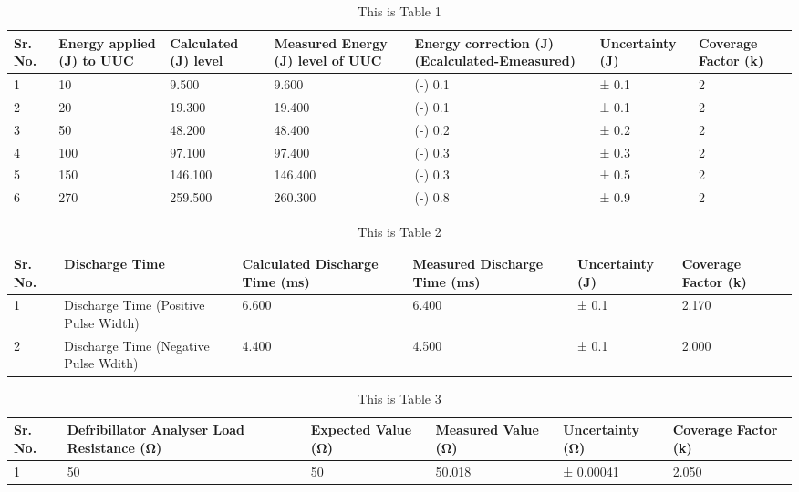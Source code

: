\begin{table}
\caption{This is Table 1}
\begin{tabular}{|p{2.2857142857142856 cm}|p{2.2857142857142856 cm}|p{2.2857142857142856 cm}|p{2.2857142857142856 cm}|p{2.2857142857142856 cm}|p{2.2857142857142856 cm}|p{2.2857142857142856 cm}|}
\toprule
Sr. No. & Energy applied (J) to UUC & Calculated (J) level & Measured Energy (J) level of UUC & Energy correction (J) (Ecalculated-Emeasured) & Uncertainty (J) & Coverage Factor (k) \\
\midrule
1 & 10 & 9.500 & 9.600 & (-) 0.1 & ± 0.1 & 2 \\
2 & 20 & 19.300 & 19.400 & (-) 0.1 & ± 0.1 & 2 \\
3 & 50 & 48.200 & 48.400 & (-) 0.2 & ± 0.2 & 2 \\
4 & 100 & 97.100 & 97.400 & (-) 0.3 & ± 0.3 & 2 \\
5 & 150 & 146.100 & 146.400 & (-) 0.3 & ± 0.5 & 2 \\
6 & 270 & 259.500 & 260.300 & (-) 0.8 & ± 0.9 & 2 \\
\bottomrule
\end{tabular}
\end{table}
\vspace{5mm}
\begin{table}
\caption{This is Table 2}
\begin{tabular}{|p{2.6666666666666665 cm}|p{2.6666666666666665 cm}|p{2.6666666666666665 cm}|p{2.6666666666666665 cm}|p{2.6666666666666665 cm}|p{2.6666666666666665 cm}|}
\toprule
Sr. No. & Discharge Time & Calculated Discharge Time (ms) & Measured Discharge Time (ms) & Uncertainty (J) & Coverage Factor (k) \\
\midrule
1 & Discharge Time (Positive Pulse Width) & 6.600 & 6.400 & ± 0.1 & 2.170 \\
2 & Discharge Time (Negative Pulse Wdith) & 4.400 & 4.500 & ± 0.1 & 2.000 \\
\bottomrule
\end{tabular}
\end{table}
\vspace{5mm}
\begin{table}
\caption{This is Table 3}
\begin{tabular}{|p{2.6666666666666665 cm}|p{2.6666666666666665 cm}|p{2.6666666666666665 cm}|p{2.6666666666666665 cm}|p{2.6666666666666665 cm}|p{2.6666666666666665 cm}|}
\toprule
Sr. No. & Defribillator Analyser Load Resistance (Ω) & Expected Value (Ω) & Measured Value (Ω) & Uncertainty (Ω) & Coverage Factor (k) \\
\midrule
1 & 50 & 50 & 50.018 &  ± 0.00041 & 2.050 \\
\bottomrule
\end{tabular}
\end{table}
